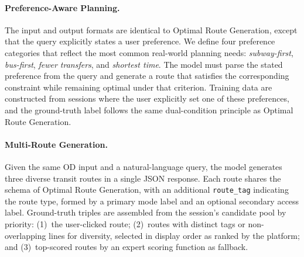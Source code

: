 \documentclass{llmxive}
\begin{document}
\paragraph{Preference-Aware Planning.}
The input and output formats are identical to Optimal Route Generation, except that the query explicitly states a user preference. We define four preference categories that reflect the most common real-world planning needs: \textit{subway-first}, \textit{bus-first}, \textit{fewer transfers}, and \textit{shortest time}. The model must parse the stated preference from the query and generate a route that satisfies the corresponding constraint while remaining optimal under that criterion. Training data are constructed from sessions where the user explicitly set one of these preferences, and the ground-truth label follows the same dual-condition principle as Optimal Route Generation.

\paragraph{Multi-Route Generation.}
Given the same OD input and a natural-language query, the model generates three diverse transit routes in a single JSON response. Each route shares the schema of Optimal Route Generation, with an additional \texttt{route\_tag} indicating the route type, formed by a primary mode label and an optional secondary access label. Ground-truth triples are assembled from the session's candidate pool by priority: (1)~the user-clicked route; (2)~routes with distinct tags or non-overlapping lines for diversity, selected in display order as ranked by the platform; and (3)~top-scored routes by an expert scoring function as fallback.
\endgroup
\end{document}
